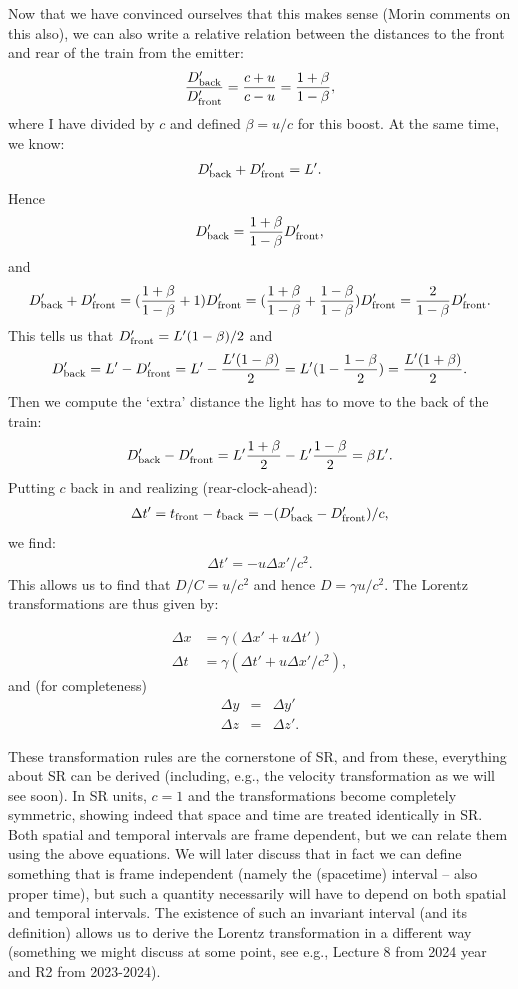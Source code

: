 \documentclass[12pt]{article}
\newcommand{\be}{\begin{eqnarray}}
\newcommand{\ee}{\end{eqnarray}}
\begin{document}
Now that we have convinced ourselves that this makes sense (Morin comments on this also), we can also write a relative relation between the distances to the front and rear of the train from the emitter:
\be
\frac{D'_{\rm back}}{D'_{\rm front}} = \frac{c+u}{c-u} = \frac{1+\beta}{1-\beta},
\ee
where I have divided by $c$ and defined $\beta = u/c$ for this boost.
At the same time, we know:
\be
D'_{\rm back} + D'_{\rm front} = L'.
\ee
Hence
\be
D'_{\rm back} = \frac{1+\beta}{1-\beta} D'_{\rm front},
\ee
and
\be
 D'_{\rm back} + D'_{\rm front}  = (\frac{1+\beta}{1-\beta}+1) D'_{\rm front}  = (\frac{1+\beta}{1-\beta} + \frac{1-\beta}{1-\beta})D'_{\rm front}  = \frac{2}{1-\beta} D'_{\rm front}.
\ee
This tells us that $D'_{\rm front} = L'(1-\beta)/2$ and
\be
D'_{\rm back} = L' - D'_{\rm front} = L' - \frac{L'(1-\beta)}{2} = L'(1-\frac{1-\beta}{2}) = \frac{L'(1+\beta)}{2}.
\ee
Then we compute the ‘extra’ distance the light has to move to the back of the train:
\be
 D'_{\rm back} - D'_{\rm front} = L' \frac{1+\beta}{2} - L' \frac{1-\beta}{2} = \beta L'.
\ee
Putting $c$ back in and realizing (rear-clock-ahead):
\be
\Delta t' = t_{\rm front}-t_{\rm back} = -(D'_{\rm back} - D'_{\rm front})/c,
\ee
we find:
\be
\Delta t'  = -u \Delta x' /c^2.
\ee
This allows us to find that $D/C = u/c^2$ and hence $D = \gamma u/c^2$.
The Lorentz transformations are thus given by:
\begin{tcolorbox}[colback=blue!5!white]
\vspace{-1.3em}
\begin{align}
\Delta x &= \gamma (\Delta x' + u \Delta t')\label{eq:xLT} \\
\Delta t &= \gamma (\Delta t' +  u\Delta x' /c^2) \label{eq:tLT},
\end{align}
and (for completeness)
\be
\Delta y &=& \Delta y' \\
\Delta z &=& \Delta z'.
\ee
\end{tcolorbox}
\noindent
These transformation rules are the cornerstone of SR, and from these, everything about SR can be derived (including, e.g., the velocity transformation as we will see soon). In SR units, $c = 1$ and the transformations become completely symmetric, showing indeed that space and time are treated identically in SR. Both spatial and temporal intervals are frame dependent, but we can relate them using the above equations. We will later discuss that in fact we can define something that is frame independent (namely the (spacetime) interval -- also proper time), but such a quantity necessarily will have to depend on both spatial and temporal intervals. The existence of such an invariant interval (and its definition) allows us to derive the Lorentz transformation in a different way (something we might discuss at some point, see e.g., Lecture 8 from 2024 year and R2 from 2023-2024).
\end{document}
